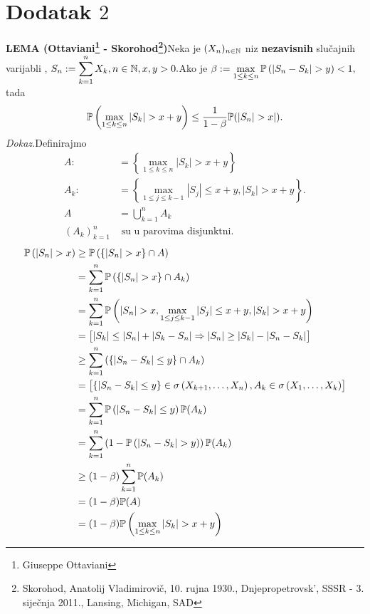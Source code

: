 \documentclass{article}
\begin{document}
\section{Dodatak \(2\)}
\textbf{LEMA (Ottaviani\footnote[40]{Giuseppe Ottaviani} - Skorohod\footnote[41]{Skorohod, Anatolij Vladimirovič, 10. rujna 1930., Dnjepropetrovsk', SSSR - 3. siječnja 2011., Lansing, Michigan, SAD})}\newline Neka je \((X_n)_{n\in\Bbb N}\) niz \textbf{nezavisnih} slučajnih varijabli , \(\displaystyle S_n:=\sum_{k=1}^nX_k,n\in\Bbb N,x,y>0.\)\newline Ako je \(\displaystyle\beta:=\max_{1\le k\le n}\Bbb P\left(|S_n-S_k|>y\right)<1,\) tada \[\Bbb P\left(\max_{1\le k\le n}|S_k|>x+y\right)\le\frac1{1-\beta}\Bbb P(|S_n|>x|).\]
\textit{Dokaz.}\newline Definirajmo \[\begin{aligned}A:&=\left\{\max_{1\le k\le n}|S_k|>x+y\right\}\\A_k:&=\left\{\max_{1\le j\le k-1}|S_j|\le x+y,|S_k|>x+y\right\}.\\A&=\bigcup_{k=1}^n A_k\\(A_k)_{k=1}^n&\text{ su u parovima disjunktni}.\end{aligned}\] \[\begin{aligned}\Bbb P\left(|S_n|>x\right)&\ge\Bbb P\left(\left\{|S_n|>x\right\}\cap A\right)\\&=\sum_{k=1}^n\Bbb P\left(\left\{|S_n|>x\right\}\cap A_k\right)\\&=\sum_{k=1}^n\Bbb P\left(|S_n|>x,\max_{1\le j\le k-1}|S_j|\le x+y,|S_k|>x+y\right)\\&=\begin{bmatrix}|S_k|\le|S_n|+|S_k-S_n|\Rightarrow |S_n|\ge|S_k|-|S_n-S_k|\end{bmatrix}\\&\ge\sum_{k=1}^n\left(\left\{|S_n-S_k|\le y\right\}\cap A_k\right)\\&=\begin{bmatrix}\left\{|S_n-S_k|\le y\right\}\in\sigma\left(X_{k+1},\ldots,X_n\right),A_k\in\sigma\left(X_1,\ldots,X_k\right)\end{bmatrix}\\&=\sum_{k=1}^n\Bbb P\left(|S_n-S_k|\le y\right)\Bbb P(A_k)\\&=\sum_{k=1}^n\left(1-\Bbb P\left(|S_n-S_k|>y\right)\right)\Bbb P(A_k)\\&\ge(1-\beta)\sum_{k=1}^n\Bbb P(A_k)\\&=(1-\beta)\Bbb P(A)\\&=(1-\beta)\Bbb P\left(\max_{1\le k\le n}|S_k|>x+y\right)\end{aligned}\]
\newpage
\end{document}
